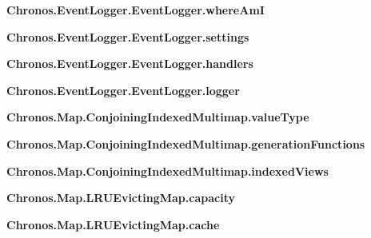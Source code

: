 \begin{DoxyCompactItemize}
\item 
{\bfseries Chronos.\+Event\+Logger.\+Event\+Logger.\+where\+AmI}\hypertarget{group__PyInfrastructure_ga7b98e31a4119fca79b52be5af2534f36}{}\label{group__PyInfrastructure_ga7b98e31a4119fca79b52be5af2534f36}

\item 
{\bfseries Chronos.\+Event\+Logger.\+Event\+Logger.\+settings}\hypertarget{group__PyInfrastructure_ga38e24822df9b8496d0f715391d0eca46}{}\label{group__PyInfrastructure_ga38e24822df9b8496d0f715391d0eca46}

\item 
{\bfseries Chronos.\+Event\+Logger.\+Event\+Logger.\+handlers}\hypertarget{group__PyInfrastructure_ga7d5e80eae53718ac65d2d8bb90166608}{}\label{group__PyInfrastructure_ga7d5e80eae53718ac65d2d8bb90166608}

\item 
{\bfseries Chronos.\+Event\+Logger.\+Event\+Logger.\+logger}\hypertarget{group__PyInfrastructure_ga4024613bc29c2649838aa32760d80b87}{}\label{group__PyInfrastructure_ga4024613bc29c2649838aa32760d80b87}

\item 
{\bfseries Chronos.\+Map.\+Conjoining\+Indexed\+Multimap.\+value\+Type}\hypertarget{group__PyInfrastructure_gae373bef5dd750a52e1f6c42314e927d1}{}\label{group__PyInfrastructure_gae373bef5dd750a52e1f6c42314e927d1}

\item 
{\bfseries Chronos.\+Map.\+Conjoining\+Indexed\+Multimap.\+generation\+Functions}\hypertarget{group__PyInfrastructure_ga2bac442b72b9d447156c8f6d87338cc0}{}\label{group__PyInfrastructure_ga2bac442b72b9d447156c8f6d87338cc0}

\item 
{\bfseries Chronos.\+Map.\+Conjoining\+Indexed\+Multimap.\+indexed\+Views}\hypertarget{group__PyInfrastructure_ga4563386ee670843138908b870e9b0fdd}{}\label{group__PyInfrastructure_ga4563386ee670843138908b870e9b0fdd}

\item 
{\bfseries Chronos.\+Map.\+L\+R\+U\+Evicting\+Map.\+capacity}\hypertarget{group__PyInfrastructure_ga7a5b2a3c19e9d39321d79e41667a5b21}{}\label{group__PyInfrastructure_ga7a5b2a3c19e9d39321d79e41667a5b21}

\item 
{\bfseries Chronos.\+Map.\+L\+R\+U\+Evicting\+Map.\+cache}\hypertarget{group__PyInfrastructure_ga0eb8363637dae0339e86fd0404ba8508}{}\label{group__PyInfrastructure_ga0eb8363637dae0339e86fd0404ba8508}

\end{DoxyCompactItemize}


